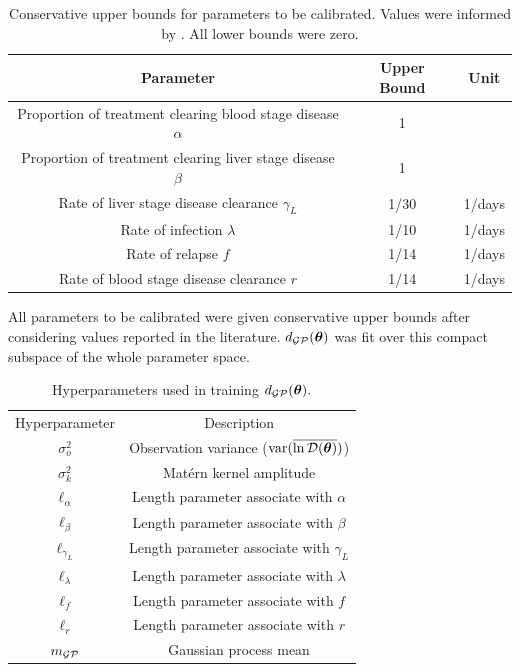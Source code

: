 \begin{table}[htbp]
    \caption{
        Conservative upper bounds for parameters to be calibrated.
        Values were informed by
        \cite{champagne_using_2022, white_variation_2016}. All lower bounds
        were zero.
    }
    \label{tab:param_bounds}
    \centering
    \begin{tabular}{c |c |c}
        Parameter
         & Upper Bound & Unit   \\
        \hline
        Proportion of treatment clearing blood stage disease $\alpha$
         & 1           &        \\
        Proportion of treatment clearing liver stage disease $\beta$
         & 1           &        \\
        Rate of liver stage disease clearance $\gamma_L$
         & 1/30        & 1/days \\
        Rate of infection $\lambda$
         & 1/10        & 1/days \\
        Rate of relapse $f$
         & 1/14        & 1/days \\
        Rate of blood stage disease clearance $r$
         & 1/14        & 1/days
    \end{tabular}
\end{table}

All parameters to be calibrated were given conservative upper bounds after
considering values reported in the literature. $d_{\mathcal{GP}}(\bm{\theta})$ was fit
over this compact subspace of the whole parameter space.

\begin{table}[htbp]
    \caption{
        Hyperparameters used in training $d_{\mathcal{GP}}(\bm{\theta}).$
    }
    \label{tab:hps}
    \centering
    \begin{tabular}{c|c}
        Hyperparameter    & Description                                \\
        $\sigma_o^2$      & Observation variance ($\operatorname{var}(\overline{\ln\mathcal{D}(\bm{\theta})})$)    \\
        $\sigma_k^2$      & Mat\'ern kernel amplitude                  \\
        $\ell_\alpha$     & Length parameter associate with $\alpha$   \\
        $\ell_\beta$      & Length parameter associate with $\beta$    \\
        $\ell_{\gamma_L}$ & Length parameter associate with $\gamma_L$ \\
        $\ell_\lambda$    & Length parameter associate with $\lambda$  \\
        $\ell_f$          & Length parameter associate with $f$        \\
        $\ell_r$          & Length parameter associate with $r$        \\
        $m_{\mathcal{GP}}$           & Gaussian process mean
    \end{tabular}
\end{table}

